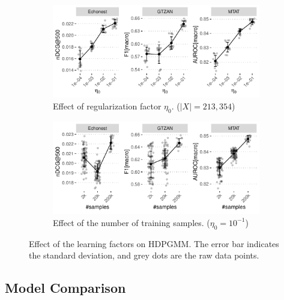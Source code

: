 \documentclass{article}
\begin{document}
\begin{figure}[h]
    \begin{subfigure}{\linewidth}    
        \centering
        \includegraphics[width=\linewidth]{figs/regularization_effect.pdf}
        \caption{Effect of regularization factor $\eta_{0}$. ($|X| = 213,354$)}
        \label{fig:effects:regularization_effect}
    \end{subfigure}

    \begin{subfigure}{\linewidth}
        \centering
        \includegraphics[width=\linewidth]{figs/num_sample_effect.pdf}
        \caption{Effect of the number of training samples. ($\eta_{0} = 10^{-1}$)}
        \label{fig:effects:num_samples_effect}
    \end{subfigure}
    \caption{Effect of the learning factors on HDPGMM. The error bar indicates the standard deviation, and grey dots are the raw data points.}
    \label{fig:effects}
\end{figure}

\subsection{Model Comparison}\label{sec:result_discussion:model_comparison}
\end{document}
